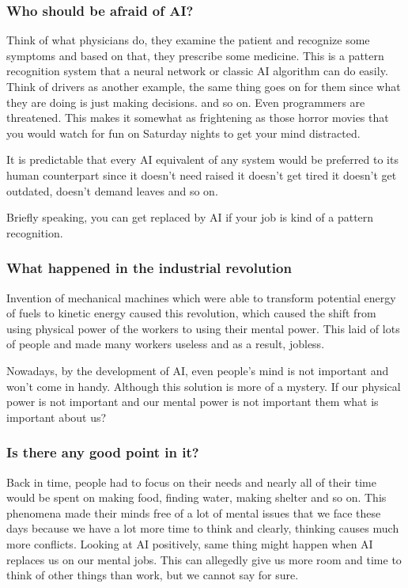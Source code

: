 \documentclass[twocolumn,a4paper, 10pt]{article}
\begin{document}
		\subsubsection{Who should be afraid of AI?}
			Think of what physicians do, they examine the patient and recognize some symptoms and
			based on that, they prescribe some medicine. This is a pattern recognition system that 
			a neural network or classic AI algorithm can do easily.
			Think of drivers as another example, the same thing goes on for them since 
			what they are doing is just making decisions. and so on.
			Even programmers are threatened. This makes it somewhat as frightening as those horror movies 
			that you would watch for fun on Saturday nights to get your mind distracted.

			It is predictable that every AI equivalent of any system would be preferred to its human 
			counterpart since it doesn't need raised it doesn't get tired it doesn't get outdated, doesn't demand leaves and so on. 

			Briefly speaking, you can get replaced by AI if your job is kind of a pattern recognition.

		\subsubsection{What happened in the industrial revolution}
			Invention of mechanical machines which were able to transform potential energy of 
			fuels to kinetic energy caused this revolution, which caused the shift from 
			using physical power of the workers to using their mental power. This laid of lots of people 
			and made many workers useless and as a result, jobless.

			Nowadays, by the development of AI, even people's mind is not important and won't come in handy.
			Although this solution is more of a mystery. If our physical power is not important 
			and our mental power is not important them what is important about us?
		
		\subsubsection{Is there any good point in it?}
			Back in time, people had to focus on their needs and nearly all of their time would be spent on 
			making food, finding water, making shelter and so on. This phenomena made their minds free of 
			a lot of mental issues that we face these days because we have a lot more time to think and 
			clearly, thinking causes much more conflicts.
			Looking at AI positively, same thing might happen when AI replaces us on our mental jobs. This can allegedly give
			us more room and time to think of other things than work, but we cannot say for sure. 
\end{document}
